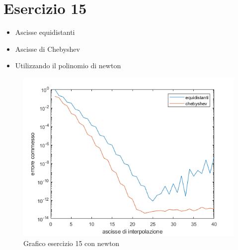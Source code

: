 \section{Esercizio 15}

\begin{itemize}
\item Ascisse equidistanti

\item Ascisse di Chebyshev

\item Utilizzando il polinomio di newton

\end{itemize}

\newpage
\begin{figure}[h!]
    \includegraphics[scale=0.8]{CodiceMatlab/Esercizio15-19/graficoEs15.png}
    \caption{Grafico esercizio 15 con newton}
    \label{fig:es15}    
\end{figure}


